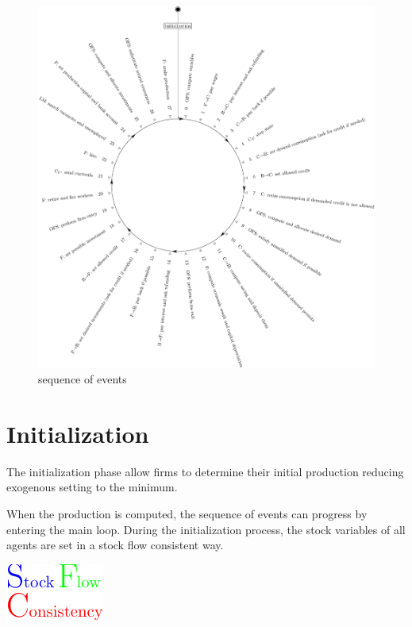 \documentclass{book}
\begin{document}
\begin{figure}[htp]
	\centering
\includegraphics[scale=0.5]{visual.pdf}
	\caption{sequence of events}
	\label{fig:sequence}
\end{figure}

\clearpage
\section{Initialization}\label{sec:initialization}
The initialization phase allow firms to determine their initial production reducing exogenous setting to the minimum. 

When the production is computed, the sequence of events can progress by entering the main loop. During the initialization process, the stock variables of all agents are set in a stock flow consistent way.\begin{marginfigure}
	\hskip1cm\includegraphics[scale=1.0]{sfc_logo-0.pdf}
\end{marginfigure}
\end{document}
